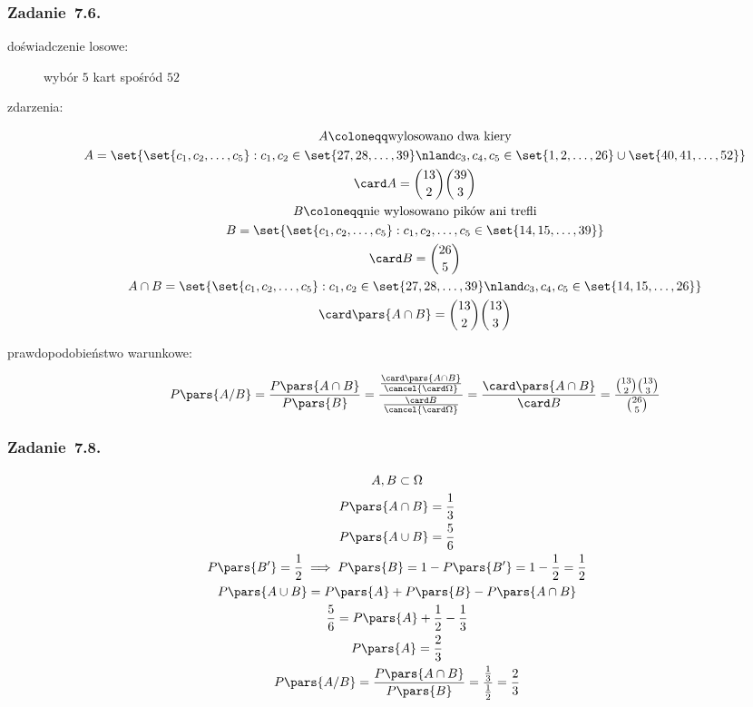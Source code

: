\subsubsection*{Zadanie~7.6.}
\begin{description}
    \item[doświadczenie losowe:] wybór \(5\) kart spośród \(52\)
    \item[zdarzenia:]
        \begin{gather*}
            A \coloneqq \text{wylosowano dwa kiery}\\
            A = \set{\set{c_1, c_2, \ldots, c_5} : c_1, c_2 \in \set{27, 28, \ldots, 39} \nland c_3, c_4, c_5 \in \set{1, 2, \ldots, 26} \cup \set{40, 41, \ldots, 52}}\\
            \card A = \binom{13}{2}\binom{39}{3}\\
            B \coloneqq \text{nie wylosowano pików ani trefli}\\
            B = \set{\set{c_1, c_2, \ldots, c_5} : c_1, c_2, \ldots, c_5 \in \set{14, 15, \ldots, 39}}\\
            \card B = \binom{26}{5}\\
            A \cap B = \set{\set{c_1, c_2, \ldots, c_5} : c_1, c_2 \in \set{27, 28, \ldots, 39} \nland c_3, c_4, c_5 \in \set{14, 15, \ldots, 26}}\\
            \card\pars{A \cap B} = \binom{13}{2}\binom{13}{3}
        \end{gather*}
    \item[prawdopodobieństwo warunkowe:]
        \begin{equation*}
            P\pars{A / B}
                = \frac{P\pars{A \cap B}}{P\pars{B}}
                = \frac{\frac{\card\pars{A \cap B}}{\cancel{\card\Omega}}}{\frac{\card B}{\cancel{\card\Omega}}}
                = \frac{\card\pars{A \cap B}}{\card B}
                = \frac{\binom{13}{2}\binom{13}{3}}{\binom{26}{5}}
        \end{equation*}
\end{description}
\subsubsection*{Zadanie~7.8.}
\begin{gather*}
    A, B \subset \Omega\\
    P\pars{A \cap B} = \frac{1}{3}\\
    P\pars{A \cup B} = \frac{5}{6}\\
    P\pars{B'} = \frac{1}{2} \implies P\pars{B} = 1 - P\pars{B'} = 1 - \frac{1}{2} = \frac{1}{2}\\
    P\pars{A \cup B} = P\pars{A} + P\pars{B} - P\pars{A \cap B}\\
    \frac{5}{6} = P\pars{A} + \frac{1}{2} - \frac{1}{3}\\
    P\pars{A} = \frac{2}{3}\\
    P\pars{A / B} = \frac{P\pars{A \cap B}}{P\pars{B}} = \frac{\frac{1}{3}}{\frac{1}{2}}
        = \frac{2}{3}
\end{gather*}
